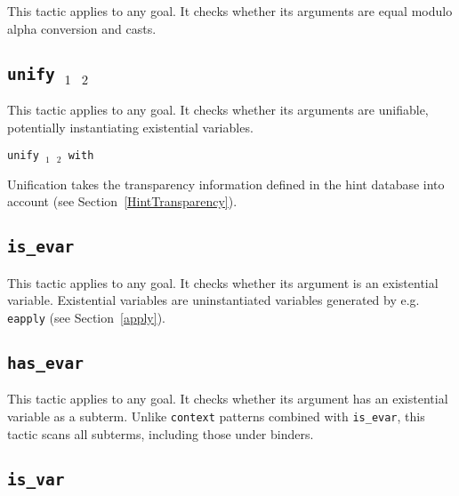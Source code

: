 \begin{coq_example*}
This tactic applies to any goal. It checks whether its arguments are
equal modulo alpha conversion and casts.

\ErrMsg {}

\subsection{\tt unify \term$_1$ \term$_2$
\label{unify}}

This tactic applies to any goal. It checks whether its arguments are
unifiable, potentially instantiating existential variables.

\ErrMsg {}

\begin{Variants}
\item {\tt unify \term$_1$ \term$_2$ with \ident}

  Unification takes the transparency information defined in the
  hint database {\tt \ident} into account (see Section~\ref{HintTransparency}).
\end{Variants}

\subsection{\tt is\_evar \term
{}
\label{isevar}}

This tactic applies to any goal. It checks whether its argument is an
existential variable. Existential variables are uninstantiated
variables generated by e.g. {\tt eapply} (see Section~\ref{apply}).

\ErrMsg {}

\subsection{\tt has\_evar \term
{}
\label{hasevar}}

This tactic applies to any goal. It checks whether its argument has an
existential variable as a subterm. Unlike {\tt context} patterns
combined with {\tt is\_evar}, this tactic scans all subterms,
including those under binders.

\ErrMsg {}

\subsection{\tt is\_var \term
{}
\label{isvar}}


\end{coq_example*}
